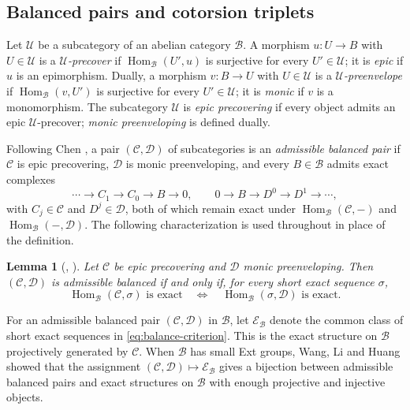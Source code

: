 \documentclass[11pt]{amsart}
\newtheorem{lemma}[theorem]{Lemma}
\theoremstyle{definition}
\theoremstyle{remark}
\theoremstyle{plain}
\numberwithin{equation}{section}
\begin{document}
\subsection{Balanced pairs and cotorsion triplets}

Let $\mathcal{U}$ be a subcategory of an abelian category $\mathcal{B}$.
A morphism $u: U \to B$ with $U \in \mathcal{U}$ is a
\emph{$\mathcal{U}$-precover} if $\operatorname{Hom}_{\mathcal{B}}(U', u)$ is surjective for every
$U' \in \mathcal{U}$; it is \emph{epic} if $u$ is an epimorphism. Dually, a
morphism $v: B \to U$ with $U \in \mathcal{U}$ is a
\emph{$\mathcal{U}$-preenvelope} if $\operatorname{Hom}_{\mathcal{B}}(v, U')$ is surjective for
every $U' \in \mathcal{U}$; it is \emph{monic} if $v$ is a monomorphism.
The subcategory $\mathcal{U}$ is \emph{epic precovering} if every object
admits an epic $\mathcal{U}$-precover; \emph{monic preenveloping} is
defined dually.

Following Chen \cite{Chen}, a pair $(\mathcal{C}, \mathcal{D})$ of subcategories is an
\emph{admissible balanced pair} if $\mathcal{C}$ is epic precovering, $\mathcal{D}$ is monic
preenveloping, and every $B \in \mathcal{B}$ admits exact complexes
\[
 \cdots \longrightarrow C_1 \longrightarrow C_0 \longrightarrow B
\longrightarrow 0, \qquad
 0 \longrightarrow B \longrightarrow D^0 \longrightarrow D^1
\longrightarrow \cdots,
\]
with $C_j \in \mathcal{C}$ and $D^j \in \mathcal{D}$, both of which remain exact under
$\operatorname{Hom}_{\mathcal{B}}(\mathcal{C}, -)$ and $\operatorname{Hom}_{\mathcal{B}}(-, \mathcal{D})$. The following
characterization is used throughout in place of the definition.

\begin{lemma}[{\cite[Proposition~2.2]{Chen}, \cite[Lemma~3.1]{EPZ}}]\label{lem:balance-criterion}
Let $\mathcal{C}$ be epic precovering and $\mathcal{D}$ monic preenveloping. Then
$(\mathcal{C}, \mathcal{D})$ is admissible balanced if and only if, for every short exact
sequence $\sigma$,
\begin{equation}\label{eq:balance-criterion}
 \operatorname{Hom}_{\mathcal{B}}(\mathcal{C}, \sigma)\text{ is exact}
 \quad \Longleftrightarrow \quad
 \operatorname{Hom}_{\mathcal{B}}(\sigma, \mathcal{D})\text{ is exact}.
\end{equation}
\end{lemma}

For an admissible balanced pair $(\mathcal{C}, \mathcal{D})$ in $\mathcal{B}$, let $\mathcal{E}_{\mathcal{B}}$ denote
the common class of short exact sequences in \eqref{eq:balance-criterion}.
This is the exact structure on $\mathcal{B}$ projectively generated by $\mathcal{C}$.
When $\mathcal{B}$ has small Ext groups, Wang, Li and
Huang \cite[Theorem~2.2]{WangLiHuang} showed that the assignment
$(\mathcal{C}, \mathcal{D}) \mapsto \mathcal{E}_{\mathcal{B}}$ gives a bijection between admissible balanced
pairs and exact structures on $\mathcal{B}$ with enough projective and injective
objects.
\end{document}

